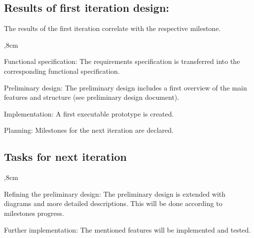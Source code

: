 \subsection{Results of first iteration design:}
The results of the first iteration correlate with the respective milestone. 
\begin{aims}
	,8cm
		\item[Functional specification:] The requirements specification is transferred into the corresponding functional specification.
		
	    \item[Preliminary design:] The preliminary design includes a first overview of the main features and structure (see preliminary design document).
		\item[Implementation:] A first executable prototype is created.
		
		\item[Planning:] Milestones for the next iteration are declared.
				
	\end{aims}

\subsection{Tasks for next iteration}

\begin{aims}
	,8cm
	\item[Refining the preliminary design:] The preliminary design is extended with diagrams and more detailed descriptions. This will be done according to milestones progress.
		
		\item[Further implementation:] The mentioned features will be implemented and tested.
	
\end{aims}